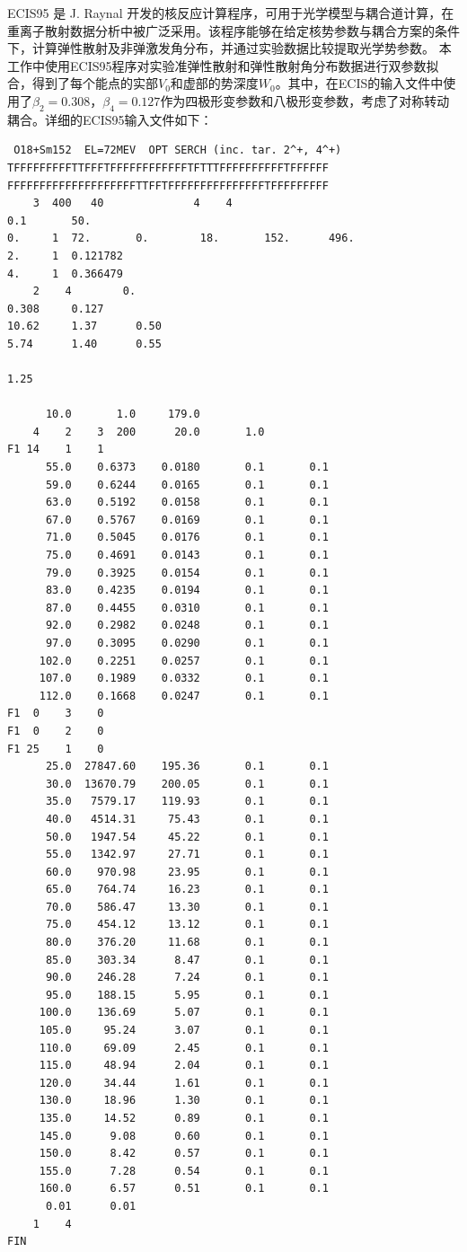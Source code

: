 ECIS95 是 J. Raynal 开发的核反应计算程序，可用于光学模型与耦合道计算，在重离子散射数据分析中被广泛采用\cite{raynal1994ecis}。该程序能够在给定核势参数与耦合方案的条件下，计算弹性散射及非弹激发角分布，并通过实验数据比较提取光学势参数。
本工作中使用ECIS95程序对实验准弹性散射和弹性散射角分布数据进行双参数拟合，得到了每个能点的实部$V_0$和虚部的势深度$W_0$。其中，在ECIS的输入文件中使用了$\beta_2 = 0.308$，$\beta_4 = 0.127$作为四极形变参数和八极形变参数，考虑了对称转动耦合。详细的ECIS95输入文件如下：
\begin{lstlisting}
 O18+Sm152  EL=72MEV  OPT SERCH (inc. tar. 2^+, 4^+)
TFFFFFFFFFTTFFFTFFFFFFFFFFFFTFTTTFFFFFFFFFFTFFFFFF 
FFFFFFFFFFFFFFFFFFFFTTFFTFFFFFFFFFFFFFFFTFFFFFFFFF 
    3  400   40              4    4 
0.1       50. 
0.     1  72.       0.        18.       152.      496. 
2.     1  0.121782
4.     1  0.366479
    2    4        0. 
0.308     0.127
10.62     1.37      0.50 
5.74      1.40      0.55 
 
1.25 

      10.0       1.0     179.0
    4    2    3  200      20.0       1.0
F1 14    1    1
      55.0    0.6373    0.0180       0.1       0.1
      59.0    0.6244    0.0165       0.1       0.1
      63.0    0.5192    0.0158       0.1       0.1
      67.0    0.5767    0.0169       0.1       0.1
      71.0    0.5045    0.0176       0.1       0.1
      75.0    0.4691    0.0143       0.1       0.1
      79.0    0.3925    0.0154       0.1       0.1
      83.0    0.4235    0.0194       0.1       0.1
      87.0    0.4455    0.0310       0.1       0.1
      92.0    0.2982    0.0248       0.1       0.1
      97.0    0.3095    0.0290       0.1       0.1
     102.0    0.2251    0.0257       0.1       0.1
     107.0    0.1989    0.0332       0.1       0.1
     112.0    0.1668    0.0247       0.1       0.1
F1  0    3    0
F1  0    2    0
F1 25    1    0
      25.0  27847.60    195.36       0.1       0.1
      30.0  13670.79    200.05       0.1       0.1
      35.0   7579.17    119.93       0.1       0.1
      40.0   4514.31     75.43       0.1       0.1
      50.0   1947.54     45.22       0.1       0.1
      55.0   1342.97     27.71       0.1       0.1
      60.0    970.98     23.95       0.1       0.1
      65.0    764.74     16.23       0.1       0.1
      70.0    586.47     13.30       0.1       0.1
      75.0    454.12     13.12       0.1       0.1
      80.0    376.20     11.68       0.1       0.1
      85.0    303.34      8.47       0.1       0.1
      90.0    246.28      7.24       0.1       0.1
      95.0    188.15      5.95       0.1       0.1
     100.0    136.69      5.07       0.1       0.1
     105.0     95.24      3.07       0.1       0.1
     110.0     69.09      2.45       0.1       0.1
     115.0     48.94      2.04       0.1       0.1
     120.0     34.44      1.61       0.1       0.1
     130.0     18.96      1.30       0.1       0.1
     135.0     14.52      0.89       0.1       0.1
     145.0      9.08      0.60       0.1       0.1
     150.0      8.42      0.57       0.1       0.1
     155.0      7.28      0.54       0.1       0.1
     160.0      6.57	  0.51       0.1       0.1
      0.01      0.01     
    1    4   
FIN
\end{lstlisting}


